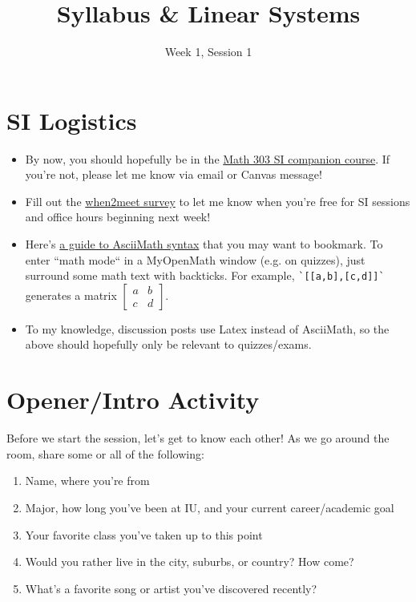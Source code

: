 \documentclass[11pt]{exam}
\title{Syllabus \& Linear Systems}
\date{Week 1, Session 1}
\begin{document}
\maketitle

\section{SI Logistics}
    \begin{itemize}
        \item By now, you should hopefully be in the \href{https://iu.instructure.com/courses/2278911}{Math 303 SI companion course}.
        If you're not, please let me know via email or Canvas message!
        \item Fill out the \href{https://www.when2meet.com/?25969358-aRu9i}{when2meet survey} to let me know when you're free for
        SI sessions and office hours beginning next week!
        \item Here's \href{https://asciimath.org/}{a guide to AsciiMath syntax} that you may want to bookmark. To enter ``math mode``
        in a MyOpenMath window (e.g. on quizzes), just surround some math text with backticks. For example,
        \verb|`[[a,b],[c,d]]`| generates a matrix $\begin{bmatrix} a & b \\ c & d \end{bmatrix}$.
        \item To my knowledge, discussion posts use Latex instead of AsciiMath, so the above should hopefully only be relevant to quizzes/exams. 
    \end{itemize}

\pagebreak
\section{Opener/Intro Activity}
    Before we start the session, let's get to know each other! As we go around the room, share some or all of the following:
    \begin{enumerate}
        \item Name, where you're from
        \item Major, how long you've been at IU, and your current career/academic goal
        \item Your favorite class you've taken up to this point
        \item Would you rather live in the city, suburbs, or country? How come?
        \item What's a favorite song or artist you've discovered recently?
    \end{enumerate}
\end{document}
